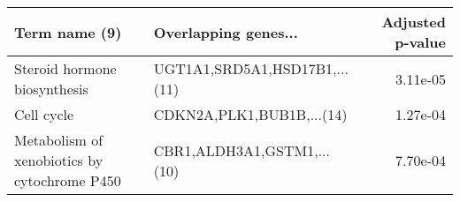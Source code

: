 \begin{tabular}{llr}
\toprule
                               Term name (9) &          Overlapping genes... &  Adjusted p-value \\
\midrule
                Steroid hormone biosynthesis & UGT1A1,SRD5A1,HSD17B1,...(11) &          3.11e-05 \\
                                  Cell cycle &     CDKN2A,PLK1,BUB1B,...(14) &          1.27e-04 \\
Metabolism of xenobiotics by cytochrome P450 &    CBR1,ALDH3A1,GSTM1,...(10) &          7.70e-04 \\
\bottomrule
\end{tabular}
